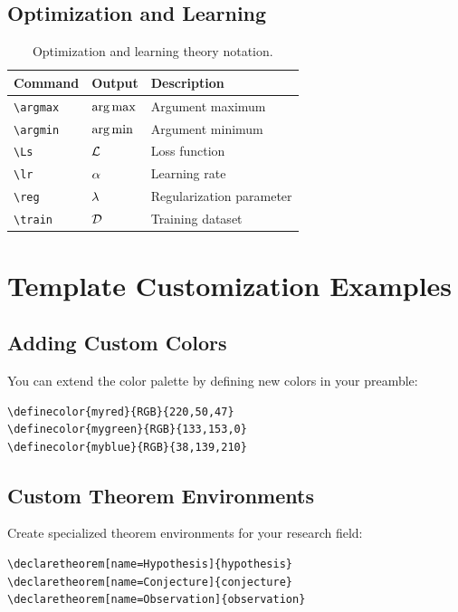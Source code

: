 \documentclass{triton}
\begin{document}
\subsection{Optimization and Learning}

\begin{table}[h]
\centering
\small
\begin{tabular}{@{}lll@{}}
\toprule
\textbf{Command} & \textbf{Output} & \textbf{Description} \\
\midrule
\verb|\argmax| & $\operatorname*{arg\,max}$ & Argument maximum \\
\verb|\argmin| & $\operatorname*{arg\,min}$ & Argument minimum \\
\verb|\Ls| & $\mathcal{L}$ & Loss function \\
\verb|\lr| & $\alpha$ & Learning rate \\
\verb|\reg| & $\lambda$ & Regularization parameter \\
\verb|\train| & $\mathcal{D}$ & Training dataset \\
\bottomrule
\end{tabular}
\caption{Optimization and learning theory notation.}
\end{table}

\section{Template Customization Examples}

\subsection{Adding Custom Colors}

You can extend the color palette by defining new colors in your preamble:

\begin{tcolorbox}[colback=ucsdgray!10,colframe=ucsdgray,title=Custom Color Definition]
\begin{verbatim}
\definecolor{myred}{RGB}{220,50,47}
\definecolor{mygreen}{RGB}{133,153,0}
\definecolor{myblue}{RGB}{38,139,210}
\end{verbatim}
\end{tcolorbox}

\subsection{Custom Theorem Environments}

Create specialized theorem environments for your research field:

\begin{tcolorbox}[colback=ucsdgray!10,colframe=ucsdgray,title=Custom Theorems]
\begin{verbatim}
\declaretheorem[name=Hypothesis]{hypothesis}
\declaretheorem[name=Conjecture]{conjecture}
\declaretheorem[name=Observation]{observation}
\end{verbatim}
\end{tcolorbox}
\end{document}
